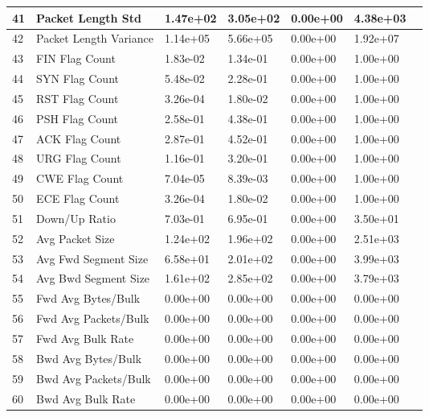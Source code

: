 \begin{center}
\begin{longtable}{|l|l|l|l|l|l|l|}
        41 & Packet Length Std & 1.47e+02 & 3.05e+02 & 0.00e+00 & 4.38e+03 \\
        \hline
        42 & Packet Length Variance & 1.14e+05 & 5.66e+05 & 0.00e+00 & 1.92e+07 \\
        \hline
        43 & FIN Flag Count & 1.83e-02 & 1.34e-01 & 0.00e+00 & 1.00e+00 \\
        \hline
        44 & SYN Flag Count & 5.48e-02 & 2.28e-01 & 0.00e+00 & 1.00e+00 \\
        \hline
        45 & RST Flag Count & 3.26e-04 & 1.80e-02 & 0.00e+00 & 1.00e+00 \\
        \hline
        46 & PSH Flag Count & 2.58e-01 & 4.38e-01 & 0.00e+00 & 1.00e+00 \\
        \hline
        47 & ACK Flag Count & 2.87e-01 & 4.52e-01 & 0.00e+00 & 1.00e+00 \\
        \hline
        48 & URG Flag Count & 1.16e-01 & 3.20e-01 & 0.00e+00 & 1.00e+00 \\
        \hline
        49 & CWE Flag Count & 7.04e-05 & 8.39e-03 & 0.00e+00 & 1.00e+00 \\
        \hline
        50 & ECE Flag Count & 3.26e-04 & 1.80e-02 & 0.00e+00 & 1.00e+00 \\
        \hline
        51 & Down/Up Ratio & 7.03e-01 & 6.95e-01 & 0.00e+00 & 3.50e+01 \\
        \hline
        52 & Avg Packet Size & 1.24e+02 & 1.96e+02 & 0.00e+00 & 2.51e+03 \\
        \hline
        53 & Avg Fwd Segment Size & 6.58e+01 & 2.01e+02 & 0.00e+00 & 3.99e+03 \\
        \hline
        54 & Avg Bwd Segment Size & 1.61e+02 & 2.85e+02 & 0.00e+00 & 3.79e+03 \\
        \hline
        55 & Fwd Avg Bytes/Bulk & 0.00e+00 & 0.00e+00 & 0.00e+00 & 0.00e+00 \\
        \hline
        56 & Fwd Avg Packets/Bulk & 0.00e+00 & 0.00e+00 & 0.00e+00 & 0.00e+00 \\
        \hline
        57 & Fwd Avg Bulk Rate & 0.00e+00 & 0.00e+00 & 0.00e+00 & 0.00e+00 \\
        \hline
        58 & Bwd Avg Bytes/Bulk & 0.00e+00 & 0.00e+00 & 0.00e+00 & 0.00e+00 \\
        \hline
        59 & Bwd Avg Packets/Bulk & 0.00e+00 & 0.00e+00 & 0.00e+00 & 0.00e+00 \\
        \hline
        60 & Bwd Avg Bulk Rate & 0.00e+00 & 0.00e+00 & 0.00e+00 & 0.00e+00 \\

\end{longtable}
\end{center}
